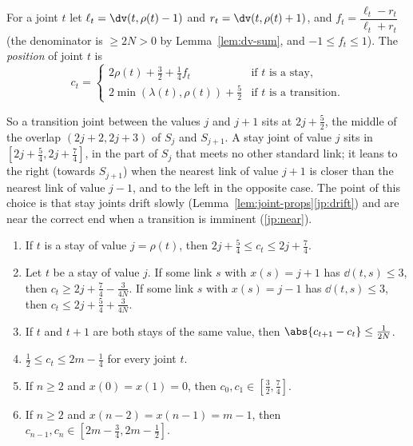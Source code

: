 
\begin{definition}\label{def:joint-positions}
For a joint $t$ let $\ell_t=\dv(t,\rho(t)-1)$ and $r_t=\dv(t,\rho(t)+1)$, and
$f_t=\dfrac{\ell_t-r_t}{\ell_t+r_t}$ (the denominator is $\ge2N>0$ by Lemma~\ref{lem:dv-sum}, and
$-1\le f_t\le1$). The \emph{position} of joint $t$ is
\[
c_t=\begin{cases}
2\rho(t)+\frac32+\frac14 f_t & \text{if $t$ is a stay},\\[3pt]
2\min(\lambda(t),\rho(t))+\frac52 & \text{if $t$ is a transition}.
\end{cases}
\]
\end{definition}


So a transition joint between the values $j$ and $j+1$ sits at $2j+\frac52$, the middle of the
overlap $(2j+2,2j+3)$ of $S_j$ and $S_{j+1}$. A stay joint of value $j$ sits in
$[2j+\frac54,2j+\frac74]$, in the part of $S_j$ that meets no other standard link; it leans
to the right (towards $S_{j+1}$) when the nearest link of value $j+1$ is closer than the nearest
link of value $j-1$, and to the left in the opposite case. The point of this choice is that
stay joints drift slowly (Lemma~\ref{lem:joint-props}\ref{jp:drift}) and are near the correct
end when a transition is imminent (\ref{jp:near}).

\begin{lemma}\label{lem:joint-props}
\begin{enumerate}[label=(\alph*)]
\item\label{jp:stay} If $t$ is a stay of value $j=\rho(t)$, then $2j+\frac54\le c_t\le2j+\frac74$.
\item\label{jp:near} Let $t$ be a stay of value $j$. If some link $s$ with $x(s)=j+1$ has
$\dd(t,s)\le3$, then $c_t\ge2j+\frac74-\frac3{4N}$. If some link $s$ with $x(s)=j-1$ has
$\dd(t,s)\le3$, then $c_t\le2j+\frac54+\frac3{4N}$.
\item\label{jp:drift} If $t$ and $t+1$ are both stays of the same value, then
$\abs{c_{t+1}-c_t}\le\frac1{2N}$.
\item\label{jp:range} $\frac12\le c_t\le2m-\frac14$ for every joint $t$.
\item\label{jp:first} If $n\ge2$ and $x(0)=x(1)=0$, then $c_0,c_1\in[\frac32,\frac74]$.
\item\label{jp:last} If $n\ge2$ and $x(n-2)=x(n-1)=m-1$, then $c_{n-1},c_n\in[2m-\frac34,2m-\frac12]$.
\end{enumerate}
\end{lemma}

